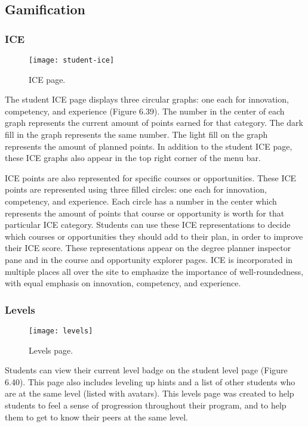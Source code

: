 \subsection{Gamification}
\subsubsection{ICE}
\begin{figure}[htbp!]
\centering
\texttt{[image: student-ice]}
\caption{ICE page.}
\end{figure}

The student ICE page displays three circular graphs: one each for innovation, competency, and experience (Figure 6.39). The number in the center of each graph represents the current amount of points earned for that category. The dark fill in the graph represents the same number. The light fill on the graph represents the amount of planned points. In addition to the student ICE page, these ICE graphs also appear in the top right corner of the menu bar. 

ICE points are also represented for specific courses or opportunities. These ICE points are represented using three filled circles: one each for innovation, competency, and experience. Each circle has a number in the center which represents the amount of points that course or opportunity is worth for that particular ICE category. Students can use these ICE representations to decide which courses or opportunities they should add to their plan, in order to improve their ICE score. These representations appear on the degree planner inspector pane and in the course and opportunity explorer pages. ICE is incorporated in multiple places all over the site to emphasize the importance of well-roundedness, with equal emphasis on innovation, competency, and experience.

\subsubsection{Levels}
\begin{figure}[htbp!]
\centering
\texttt{[image: levels]}
\caption{Levels page.}
\end{figure}

Students can view their current level badge on the student level page (Figure 6.40). This page also includes leveling up hints and a list of other students who are at the same level (listed with avatars). This levels page was created to help students to feel a sense of progression throughout their program, and to help them to get to know their peers at the same level.


